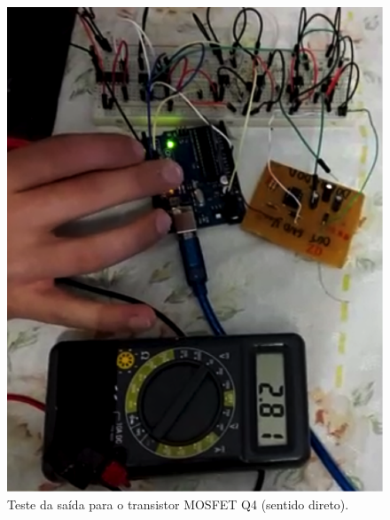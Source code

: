 \begin{anexosenv}
      \begin{figure}
          \begin{center}
              \includegraphics{figuras/teste_alimentacao_3.png}
          \end{center}
          \caption{Teste da saída para o transistor MOSFET Q4 (sentido direto).}
          \label{fig:teste_alimentacao_3.png}
      \end{figure}


\end{anexosenv}
